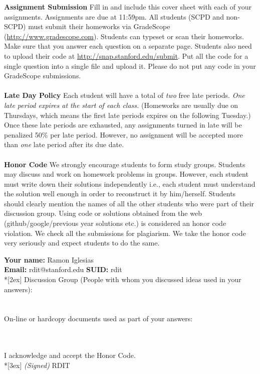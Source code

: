 \documentclass[11pt]{article}
\begin{document}
\textbf{Assignment Submission } Fill in and include this cover sheet with each of your assignments. Assignments are due at 11:59pm. All students (SCPD and non-SCPD) must submit their homeworks via GradeScope (\url{http://www.gradescope.com}). Students can typeset or scan their homeworks. Make sure that you answer each question on a separate page. Students also need to upload their code at \url{http://snap.stanford.edu/submit}. Put all the code for a single question into a single file and upload it. Please do not put any code in your GradeScope submissions. 
\\
\\
\textbf{Late Day Policy } Each student will have a total of {\em two} free late periods. {\em One late period expires at the start of each class.} (Homeworks are usually due on Thursdays, which means the first late periods expires on the following Tuesday.) Once these late periods are exhausted, any assignments turned in late will be penalized 50\% per late period. However, no assignment will be accepted more than {\em one} late period after its due date. 
\\
\\
\textbf{Honor Code } We strongly encourage students to form study groups. Students may discuss and work on homework problems in groups. However, each student must write down their solutions independently i.e., each student must understand the solution well enough in order to reconstruct it by him/herself.  Students should clearly mention the names of all the other students who were part of their discussion group. Using code or solutions obtained from the web (github/google/previous year solutions etc.) is considered an honor code violation. We check all the submissions for plagiarism. We take the honor code very seriously and expect students to do the same. 

\vfill
\vfill

{\Large
\textbf{Your name:} Ramon Iglesias \\
\textbf{Email:} rdit@stanford.edu \textbf{SUID:} rdit\\*[2ex] }
Discussion Group (People with whom you discussed ideas used in your answers): \\\\\\
On-line or hardcopy documents used as part of your answers: \\\\\\
\vfill

\vfill

I acknowledge and accept the Honor Code.\\*[3ex]
\bigskip
\textit{(Signed)} RDIT

\vfill
\vfill
\end{document}
